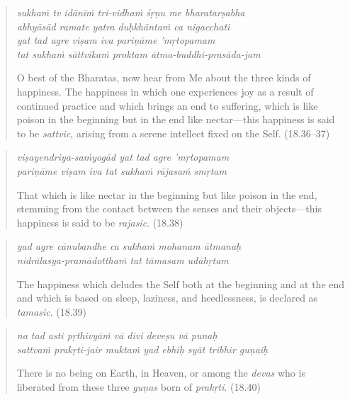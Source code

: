 \documentclass[12pt, twoside, openright]{memoir}
\begin{document}
\par
\begin{verse}
\textit{sukhaṁ tv idānīṁ tri-vidhaṁ śṛṇu me bharatarṣabha} \\
\textit{abhyāsād ramate yatra duḥkhāntaṁ ca nigacchati} \\
\textit{yat tad agre viṣam iva pariṇāme ’mṛtopamam} \\
\textit{tat sukhaṁ sāttvikaṁ proktam ātma-buddhi-prasāda-jam}

\noindent O best of the Bharatas, now hear from Me about the three kinds of happiness. The happiness in which one experiences joy as a result of continued practice and which brings an end to suffering, which is like poison in the beginning but in the end like nectar---this happiness is said to be \textit{sattvic}, arising from a serene intellect fixed on the Self. (18.36–37)
\end{verse}
\par



\par
\begin{verse}
\textit{viṣayendriya-saṁyogād yat tad agre ’mṛtopamam} \\
\textit{pariṇāme viṣam iva tat sukhaṁ rājasaṁ smṛtam}

\noindent That which is like nectar in the beginning but like poison in the end, stemming from the contact between the senses and their objects---this happiness is said to be \textit{rajasic}. (18.38)
\end{verse}
\par



\par
\begin{verse}
\textit{yad agre cānubandhe ca sukhaṁ mohanam ātmanaḥ} \\
\textit{nidrālasya-pramādotthaṁ tat tāmasam udāhṛtam}

\noindent The happiness which deludes the Self both at the beginning and at the end and which is based on sleep, laziness, and heedlessness, is declared as \textit{tamasic}. (18.39)
\end{verse}
\par



\par
\begin{verse}
\textit{na tad asti pṛthivyāṁ vā divi deveṣu vā punaḥ} \\
\textit{sattvaṁ prakṛti-jair muktaṁ yad ebhiḥ syāt tribhir guṇaiḥ}

\noindent There is no being on Earth, in Heaven, or among the \textit{devas} who is liberated from these three \textit{guṇas} born of \textit{prakṛti}. (18.40)
\end{verse}
\par
\end{document}
